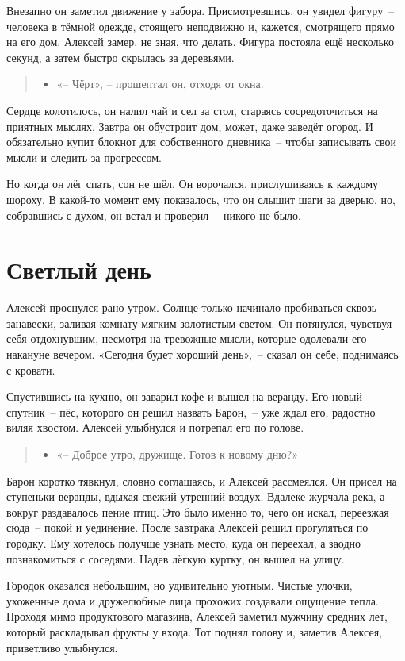 \documentclass[12pt,a4paper]{book}
\newenvironment{dialogue}{\begin{quote}\itshape\begin{itemize}\item[]}{\end{itemize}\end{quote}}
\begin{document}
Внезапно он заметил движение у забора. Присмотревшись, он увидел фигуру~-- человека в тёмной одежде, стоящего неподвижно и, кажется, смотрящего прямо на его дом. Алексей замер, не зная, что делать. Фигура постояла ещё несколько секунд, а затем быстро скрылась за деревьями.

\begin{dialogue}
    «-- Чёрт», -- прошептал он, отходя от окна.
\end{dialogue}

Сердце колотилось, он налил чай и сел за стол, стараясь сосредоточиться на приятных мыслях. Завтра он обустроит дом, может, даже заведёт огород. И обязательно купит блокнот для собственного дневника~-- чтобы записывать свои мысли и следить за прогрессом.

Но когда он лёг спать, сон не шёл. Он ворочался, прислушиваясь к каждому шороху. В какой-то момент ему показалось, что он слышит шаги за дверью, но, собравшись с духом, он встал и проверил~-- никого не было.

\chapter{Светлый день}

Алексей проснулся рано утром. Солнце только начинало пробиваться сквозь занавески, заливая комнату мягким золотистым светом. Он потянулся, чувствуя себя отдохнувшим, несмотря на тревожные мысли, которые одолевали его накануне вечером. «Сегодня будет хороший день»,~-- сказал он себе, поднимаясь с кровати.

Спустившись на кухню, он заварил кофе и вышел на веранду. Его новый спутник~-- пёс, которого он решил назвать Барон,~-- уже ждал его, радостно виляя хвостом. Алексей улыбнулся и потрепал его по голове.

\begin{dialogue}
«-- Доброе утро, дружище. Готов к новому дню?»
\end{dialogue}

Барон коротко тявкнул, словно соглашаясь, и Алексей рассмеялся. Он присел на ступеньки веранды, вдыхая свежий утренний воздух. Вдалеке журчала река, а вокруг раздавалось пение птиц. Это было именно то, чего он искал, переезжая сюда~-- покой и уединение.
После завтрака Алексей решил прогуляться по городку. Ему хотелось получше узнать место, куда он переехал, а заодно познакомиться с соседями. Надев лёгкую куртку, он вышел на улицу.

Городок оказался небольшим, но удивительно уютным. Чистые улочки, ухоженные дома и дружелюбные лица прохожих создавали ощущение тепла. Проходя мимо продуктового магазина, Алексей заметил мужчину средних лет, который раскладывал фрукты у входа. Тот поднял голову и, заметив Алексея, приветливо улыбнулся.
\end{document}
